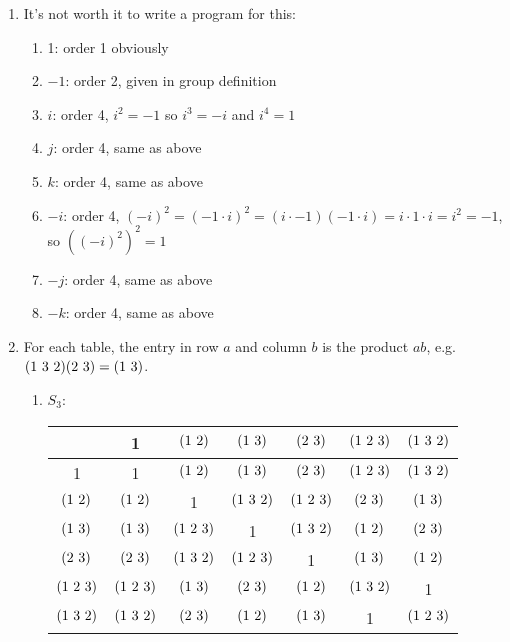 \documentclass[]{article}
\newcommand*{\cycle}[1]{( \foreach \entry [count=\i] in {#1} {\ifnum\i>1\ \fi\entry})}
\begin{document}
\begin{enumerate}

\item It's not worth it to write a program for this:
\begin{enumerate}
\item 1: order 1 obviously
\item $-1$: order 2, given in group definition
\item $i$: order 4, $i^2 = -1$ so $i^3 = -i$ and $i^4 = 1$
\item $j$: order 4, same as above
\item $k$: order 4, same as above
\item $-i$: order 4, $(-i)^2 = (-1\cdot i)^2 = (i\cdot -1)(-1 \cdot i) = i\cdot 1 \cdot i = i^2 = -1$, so $\left((-i)^2\right)^2 = 1$
\item $-j$: order 4, same as above
\item $-k$: order 4, same as above
\end{enumerate}

\renewcommand{\arraystretch}{1.25}
\item For each table, the entry in row $a$ and column $b$ is the product $ab$, e.g. $\cycle{1,3,2}\cycle{2,3} = \cycle{1,3}$.
\begin{enumerate}
\item $S_3$:
\begin{table}[h!] \centering
\begin{tabular}{c|c|c|c|c|c|c|}
& 1 & $\cycle{1,2}$ & $\cycle{1,3}$ & $\cycle{2,3}$ & $\cycle{1,2,3}$ & $\cycle{1,3,2}$ \\ \hline
1 & 1 & $\cycle{1,2}$ & $\cycle{1,3}$ & $\cycle{2,3}$ & $\cycle{1,2,3}$ & $\cycle{1,3,2}$  \\ \hline
$\cycle{1,2}$ & $\cycle{1,2}$ & 1 & $\cycle{1,3,2}$ & $\cycle{1,2,3}$ & $\cycle{2,3}$ & $\cycle{1,3}$ \\ \hline
$\cycle{1,3}$ & $\cycle{1,3}$ & $\cycle{1,2,3}$ & 1 & $\cycle{1,3,2}$ & $\cycle{1,2}$ & $\cycle{2,3}$ \\ \hline
$\cycle{2,3}$ & $\cycle{2,3}$ & $\cycle{1,3,2}$ & $\cycle{1,2,3}$ & 1 & $\cycle{1,3}$ & $\cycle{1,2}$ \\ \hline
$\cycle{1,2,3}$ & $\cycle{1,2,3}$ & $\cycle{1,3}$ & $\cycle{2,3}$ & $\cycle{1,2}$ & $\cycle{1,3,2}$ & 1 \\ \hline
$\cycle{1,3,2}$ & $\cycle{1,3,2}$ & $\cycle{2,3}$ & $\cycle{1,2}$ & $\cycle{1,3}$ & 1 & $\cycle{1,2,3}$ \\ \hline
\end{tabular}
\end{table}


\end{enumerate}
\end{enumerate}
\end{document}

